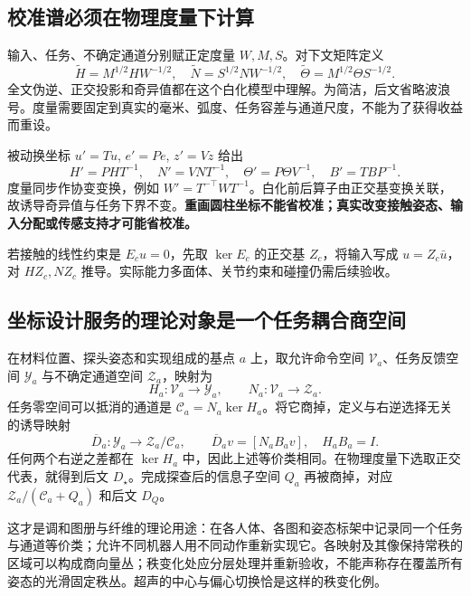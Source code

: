 \documentclass[11pt,a4paper]{article}
\numberwithin{equation}{section}
\theoremstyle{definition}
\begin{document}
\subsection{校准谱必须在物理度量下计算}
输入、任务、不确定通道分别赋正定度量 $W,M,S$。对下文矩阵定义
\begin{equation}
 \widetilde H=M^{1/2}HW^{-1/2},\quad
 \widetilde N=S^{1/2}NW^{-1/2},\quad
 \widetilde\Theta=M^{1/2}\Theta S^{-1/2}.
\end{equation}
全文伪逆、正交投影和奇异值都在这个白化模型中理解。为简洁，后文省略波浪号。度量需要固定到真实的毫米、弧度、任务容差与通道尺度，不能为了获得收益而重设。

被动换坐标 $u'=Tu$, $e'=Pe$, $z'=Vz$ 给出
\begin{equation}
 H'=PHT^{-1},\quad N'=VNT^{-1},\quad
 \Theta'=P\Theta V^{-1},\quad B'=TBP^{-1}.
\end{equation}
度量同步作协变变换，例如 $W'=T^{-\top}WT^{-1}$。白化前后算子由正交基变换关联，故诱导奇异值与任务下界不变。\textbf{重画圆柱坐标不能省校准；真实改变接触姿态、输入分配或传感支持才可能省校准。}

若接触的线性约束是 $E_cu=0$，先取 $\ker E_c$ 的正交基 $Z_c$，将输入写成 $u=Z_c\bar u$，对 $HZ_c,NZ_c$ 推导。实际能力多面体、关节约束和碰撞仍需后续验收。

\subsection{坐标设计服务的理论对象是一个任务耦合商空间}
在材料位置、探头姿态和实现组成的基点 $a$ 上，取允许命令空间 $\mathcal V_a$、任务反馈空间 $\mathcal Y_a$ 与不确定通道空间 $\mathcal Z_a$，映射为
\begin{equation}
 H_a:\mathcal V_a\longrightarrow\mathcal Y_a,\qquad
 N_a:\mathcal V_a\longrightarrow\mathcal Z_a.
\end{equation}
任务零空间可以抵消的通道是 $\mathcal C_a=N_a\ker H_a$。将它商掉，定义与右逆选择无关的诱导映射
\begin{equation}
 \overline D_a:\mathcal Y_a\longrightarrow\mathcal Z_a/\mathcal C_a,
 \qquad \overline D_av=[N_aB_av],\quad H_aB_a=I.
\end{equation}
任何两个右逆之差都在 $\ker H_a$ 中，因此上述等价类相同。在物理度量下选取正交代表，就得到后文 $D_\star$。完成探查后的信息子空间 $Q_a$ 再被商掉，对应 $\mathcal Z_a/(\mathcal C_a+Q_a)$ 和后文 $D_Q$。

这才是调和图册与纤维的理论用途：在各人体、各图和姿态标架中记录同一个任务与通道等价类；允许不同机器人用不同动作重新实现它。各映射及其像保持常秩的区域可以构成商向量丛；秩变化处应分层处理并重新验收，不能声称存在覆盖所有姿态的光滑固定秩丛。超声的中心与偏心切换恰是这样的秩变化例。
\end{document}
